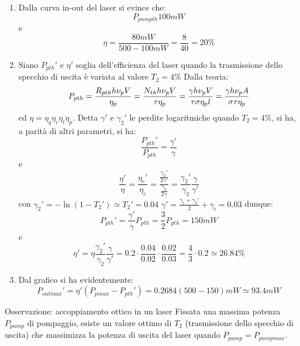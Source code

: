 \begin{enumerate}
\begin{enumerate}
\item Dalla curva in-out del laser si evince che:
\begin{equation*}
P_{pump th} 100 mW
\end{equation*}
e
\begin{equation*}
\eta = \frac{80 mW}{500 -100 mW} = \frac{8}{40} = 20\%
\end{equation*}

\item Siano $P_{p th}'$ e $\eta'$ soglia dell'efficienza del laser quando la trasmissione dello specchio di uscita è variata al valore $T_2 = 4\%$
Dalla teoria:
\begin{equation*}
P_{p th} = \frac{R_{p th} h\nu_p V}{\eta_p} = \frac{N_{th} h\nu_p V}{\tau \eta_p} = \frac{\gamma h\nu_p V}{\tau \sigma \eta_p l} = \frac{\gamma h\nu_p A}{\sigma \tau \eta_p}
\end{equation*}
ed $\eta = \eta_q\eta_c\eta_t\eta_p$.
Detta $\gamma'$ e $\gamma_2'$ le perdite logaritmiche quando $T_2 = 4\%$, si ha, a parità di altri parametri, si ha:
\begin{equation*}
\frac{P_{p th}'}{P_{p th}} = \frac{\gamma'}{\gamma}
\end{equation*}
e
\begin{equation*}
\frac{\eta'}{\eta} = \frac{\eta_c'}{\eta_c} = \frac{\frac{\gamma_2'}{2\gamma'}}{\frac{\gamma_2}{2\gamma}} = \frac{\gamma_2'}{\gamma_2} \frac{\gamma}{\gamma'}
\end{equation*}
con $\gamma_2' = - \ln (1-T_2') \simeq T_2' = 0.04$ $\gamma' = \frac{\gamma_1 + \gamma_2'}{2} + \gamma_i = 0.03$
dunque:
\begin{equation*}
P_{p th}' = \frac{\gamma'}{\gamma} P_{p th} = \frac{3}{2} P_{p th} = 150 mW
\end{equation*}
e
\begin{equation*}
\eta' = \eta \frac{\gamma_2'}{\gamma_2} \frac{\gamma}{\gamma'} = 0.2\cdot \frac{0.04}{0.02} \cdot \frac{0.02}{0.03} = \frac{4}{3} \cdot 0.2 \simeq 26.84\%
\end{equation*}
\item %
Dal grafico si ha evidentemente:
\begin{equation*}
P_{out max}' = \eta'(P_{p max} - P_{p th}') = 0.2684 (500 -150) mW \simeq 93.4 mW
\end{equation*}
\end{enumerate}

Osservazione: accoppiamento ottico in un laser
Fissata una massima potenza $P_{pump}$ di pompaggio, esiste un valore ottimo di $T_2$ (trasmissione dello specchio di uscita) che massimizza la potenza di uscita del laser quando $P_{pump} = P_{pump max}$.


\end{enumerate}
